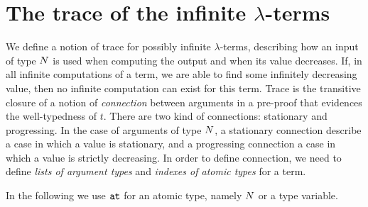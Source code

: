 \section{The trace of the infinite $\lambda$-terms}\label{section-trace-infinite-lambda-terms}


We define a notion of trace for possibly infinite $\lambda$-terms, 
describing how an input of type ${N}$ is used when computing the output
and when its value decreases. 
If, in all infinite computations of a term, we are able to find some infinitely
decreasing value, then no infinite computation can exist for this term. 
Trace is the transitive closure of a notion of \emph{connection} 
between arguments in a pre-proof that evidences the well-typedness of $t$. 
There are two kind of connections: stationary and progressing.
In the case of arguments of type ${N}$, a stationary connection 
describe a case in which a value is stationary, and a progressing connection 
a case in which a value is strictly decreasing.
In order to define connection, we need to define \emph{lists of argument types} 
and \emph{indexes of atomic types} for a term.

In the following we use ${\tt at}$ for an atomic type, namely ${N}$ or a type variable. 

%
%

